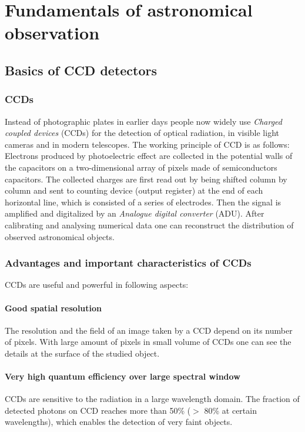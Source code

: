 \section{Fundamentals of astronomical observation} \label{intro}
\subsection{Basics of CCD detectors} \label{ccd}
\subsubsection{CCDs}
Instead of photographic plates in earlier days people now widely use \textit{Charged coupled devices} (CCDs) for the detection of optical radiation, in visible light cameras and in modern telescopes. The working principle of CCD is as follows: Electrons produced by photoelectric effect are collected in the potential walls of the capacitors on a two-dimensional array of pixels made of semiconductors capacitors. The collected charges are first read out by being shifted column by column and sent to counting device (output register) at the end of each horizontal line, which is consisted of a series of electrodes. Then the signal is amplified and digitalized by an \textit{Analogue digital converter} (ADU). After calibrating and analysing numerical data one can reconstruct the distribution of observed astronomical objects.

\subsubsection{Advantages and important characteristics of CCDs}
CCDs are useful and powerful in following aspects:

\paragraph{Good spatial resolution}
  The resolution and the field of an image taken by a CCD depend on its number of pixels. With large amount of pixels in small volume of CCDs one can see the details at the surface of the studied object.
  
\paragraph{Very high quantum efficiency over large spectral window}
  CCDs are sensitive to the radiation in a large wavelength domain. The fraction of detected photons on CCD reaches more than 50\% ($>$ 80\% at certain wavelengths), which enables the detection of very faint objects. 
  
